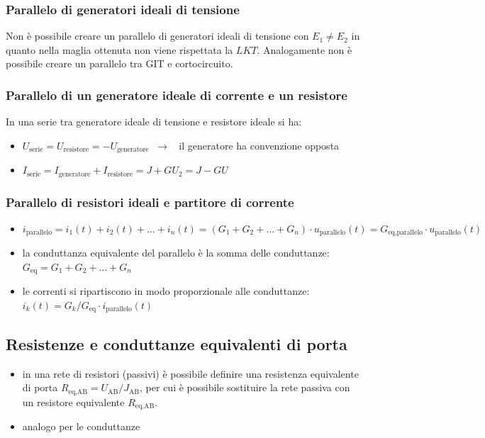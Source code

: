 \documentclass[a4paper]{article}
\begin{document}
\subsubsection*{Parallelo di generatori ideali di tensione}
Non è possibile creare un parallelo di generatori ideali di tensione con \(E_1 \neq E_2\) in quanto nella maglia ottenuta non
viene rispettata la \(LKT\). Analogamente non è possibile creare un parallelo tra GIT e cortocircuito.

\subsubsection*{Parallelo di un generatore ideale di corrente e un resistore}
In una serie tra generatore ideale di tensione e resistore ideale si ha:
\begin{itemize}
	\item \(U_\text{serie} = U_\text{resistore} = -U_\text{generatore} \;\; \rightarrow \;\;\) il generatore ha convenzione opposta
	\item \(I_\text{serie} = I_\text{generatore} + I_\text{resistore} = J + G U_2 = J - GU\)
\end{itemize}

\subsubsection*{Parallelo di resistori ideali e partitore di corrente}
\begin{itemize}
	\item \(i_\text{parallelo} = i_1(t) + i_2(t) + \dots + i_n(t) = (G_1 + G_2 + \dots + G_n) \cdot u_\text{parallelo}(t) = G_\text{eq,parallelo} \cdot u_\text{parallelo}(t)\)
	\item la conduttanza equivalente del parallelo è la somma delle conduttanze: \(G_\text{eq} = G_1 + G_2 + \dots + G_n\) 
	\item le correnti si ripartiscono in modo proporzionale alle conduttanze: \(i_k(t) = G_k / G_\text{eq} \cdot i_\text{parallelo}(t)\)
\end{itemize}

\subsection{Resistenze e conduttanze equivalenti di porta}
\begin{itemize}
	\item in una rete di resistori (passivi) è possibile definire una resistenza equivalente di porta \(R_\text{eq,AB} = U_\text{AB}/J_\text{AB}\),
	per cui è possibile sostituire la rete passiva con un resistore equivalente \(R_\text{eq,AB}\).
	\item analogo per le conduttanze
\end{itemize}
\end{document}
